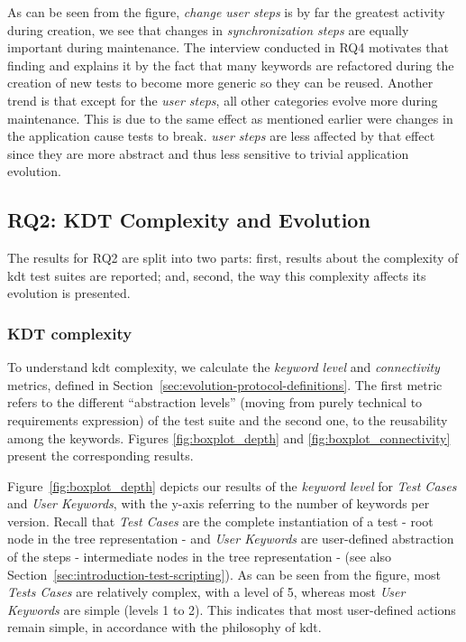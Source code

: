 As can be seen from the figure, \emph{change user steps} is by far the greatest activity during creation, we see that changes in \emph{synchronization steps} are equally important during maintenance. The interview conducted in RQ4 motivates that finding and explains it by the fact that many keywords are refactored during the creation of new tests to become more generic so they can be reused. Another trend is that except for the \emph{user steps}, all other categories evolve more during maintenance. This is due to the same effect as mentioned earlier were changes in the application cause tests to break. \emph{user steps} are less affected by that effect since they are more abstract and thus less sensitive to trivial application evolution.

\subsection{RQ2: KDT Complexity and Evolution}
\label{sec:evolution-results-rq2}

The results for RQ2 are split into two parts: first, results about the complexity of \gls{kdt} test suites are reported; and, second, the way this complexity affects its evolution is presented.

\subsubsection{KDT complexity}
\label{sec:kdt-test-suite}

To understand \gls{kdt} complexity, we calculate the \emph{keyword level} and \emph{connectivity} metrics, defined in Section~\ref{sec:evolution-protocol-definitions}. The first metric refers to the different ``abstraction levels'' (moving from purely technical to requirements expression) of the test suite and the second one, to the reusability among the keywords. Figures \ref{fig:boxplot_depth} and \ref{fig:boxplot_connectivity} present the corresponding results.

Figure~\ref{fig:boxplot_depth} depicts our results of the \emph{keyword level} for \emph{Test Cases} and \emph{User Keywords}, with the y-axis referring to the number of keywords per version. Recall that \emph{Test Cases} are the complete instantiation of a test - root node in the tree representation - and \emph{User Keywords} are user-defined abstraction of the steps - intermediate nodes in the tree representation - (see also Section~\ref{sec:introduction-test-scripting}). As can be seen from the figure, most \emph{Tests Cases} are relatively complex, with a level of 5, whereas most \emph{User Keywords} are simple (levels 1 to 2). This indicates that most user-defined actions remain simple, in accordance with the philosophy of \gls{kdt}.

